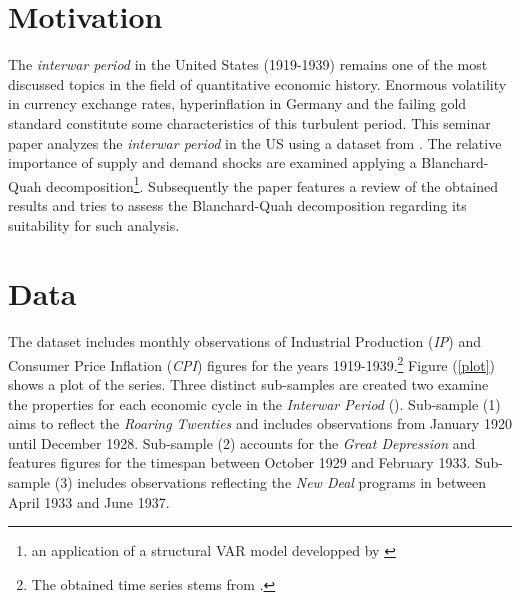 %
%
%
%
%

\section{Motivation}
\label{s:mot}

The \textit{interwar period} in the United States (1919-1939) remains one of the most discussed topics in the field of quantitative economic history. Enormous volatility in currency exchange rates, hyperinflation in Germany and the failing gold standard constitute some characteristics of this turbulent period. This seminar paper analyzes the \textit{interwar period} in the US using a dataset from \cite{reichsamt}. The relative importance of supply and demand shocks are examined applying a Blanchard-Quah decomposition\footnote{an application of a structural VAR model developped by \cite{blanchard}}. Subsequently the paper features a review of the obtained results and tries to assess the Blanchard-Quah decomposition regarding its suitability for such analysis.

%
%
%
%
%
\section{Data}
\label{s:data}

The dataset includes monthly observations of Industrial Production (\textit{IP}) and Consumer Price Inflation (\textit{CPI}) figures for the years 1919-1939.\footnote{The obtained time series stems from \cite{reichsamt}.} Figure (\ref{plot}) shows a plot of the series. Three distinct sub-samples are created two examine the properties for each economic cycle in the \textit{Interwar Period} (\cite{feinstein}). Sub-sample (1) aims to reflect the \textit{Roaring Twenties} and includes observations from January 1920 until December 1928. Sub-sample (2) accounts for the \textit{Great Depression} and features figures for the timespan between October 1929 and February 1933. Sub-sample (3) includes observations reflecting the \textit{New Deal} programs in between April 1933 and June 1937.

